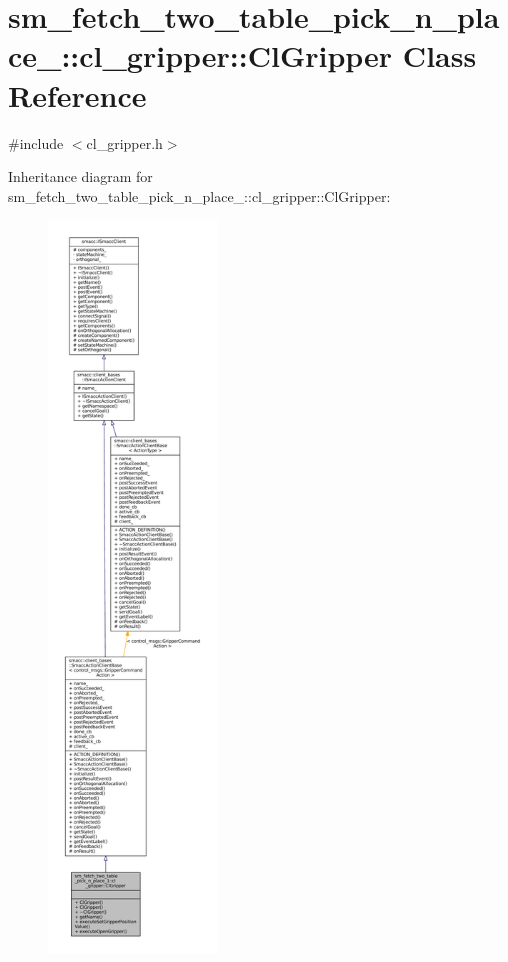 \hypertarget{classsm__fetch__two__table__pick__n__place__1_1_1cl__gripper_1_1ClGripper}{}\section{sm\+\_\+fetch\+\_\+two\+\_\+table\+\_\+pick\+\_\+n\+\_\+place\+\_\+:\+:cl\+\_\+gripper\+:\+:Cl\+Gripper Class Reference}
\label{classsm__fetch__two__table__pick__n__place__1_1_1cl__gripper_1_1ClGripper}


{\ttfamily \#include $<$cl\+\_\+gripper.\+h$>$}



Inheritance diagram for sm\+\_\+fetch\+\_\+two\+\_\+table\+\_\+pick\+\_\+n\+\_\+place\+\_\+:\+:cl\+\_\+gripper\+:\+:Cl\+Gripper\+:
\nopagebreak
\begin{figure}[H]
\begin{center}
\leavevmode
\includegraphics[height=550pt]{classsm__fetch__two__table__pick__n__place__1_1_1cl__gripper_1_1ClGripper__inherit__graph}
\end{center}
\end{figure}


